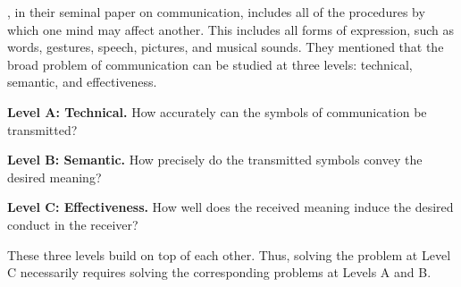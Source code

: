 



\citet{shannon-weaver-1949}, in their seminal paper on communication, includes all of the procedures by which one mind may affect another. This includes all forms of expression, such as words, gestures, speech, pictures, and musical sounds. They mentioned that the broad problem of communication can be studied at three levels: technical, semantic, and effectiveness.

\textbf{Level A: Technical.} How accurately can the symbols of communication be transmitted?

\textbf{Level B: Semantic.} How precisely do the transmitted symbols convey the desired meaning?

\textbf{Level C: Effectiveness.} How well does the received meaning induce the desired conduct in the receiver?

These three levels build on top of each other. Thus, solving the problem at Level C necessarily requires solving the corresponding problems at Levels A and B.

